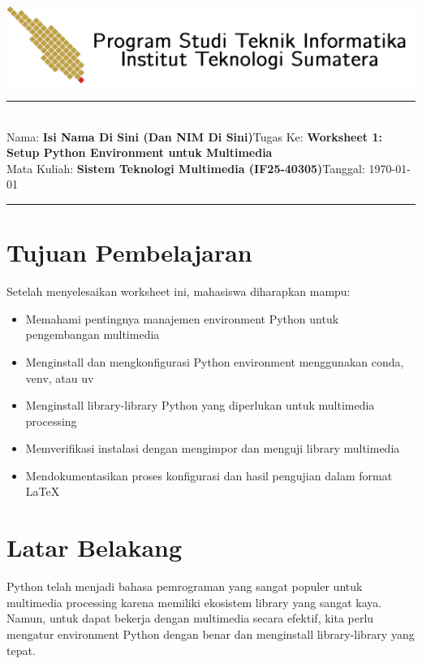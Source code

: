 \documentclass[11pt,a4paper]{article}
\newcommand{\student}{\textbf{Isi Nama Di Sini (Dan NIM Di Sini)}}
\newcommand{\course}{\textbf{Sistem Teknologi Multimedia (IF25-40305)}}
\newcommand{\assignment}{\textbf{Worksheet 1: Setup Python Environment untuk Multimedia}}
\begin{document}
\thispagestyle{empty}
\begin{center}
	\includegraphics[scale = 0.15]{Figure/ifitera-header.png}
	\vspace{0.1cm}
\end{center}
\noindent
\rule{17cm}{0.2cm}\\[0.3cm]
Nama: \student \hfill Tugas Ke: \assignment\\[0.1cm]
Mata Kuliah: \course \hfill Tanggal: \today\\
\rule{17cm}{0.05cm}
\vspace{0.1cm}



\section{Tujuan Pembelajaran}
Setelah menyelesaikan worksheet ini, mahasiswa diharapkan mampu:
\begin{itemize}
    \item Memahami pentingnya manajemen environment Python untuk pengembangan multimedia
    \item Menginstall dan mengkonfigurasi Python environment menggunakan conda, venv, atau uv
    \item Menginstall library-library Python yang diperlukan untuk multimedia processing
    \item Memverifikasi instalasi dengan mengimpor dan menguji library multimedia
    \item Mendokumentasikan proses konfigurasi dan hasil pengujian dalam format \LaTeX
\end{itemize}

\section{Latar Belakang}
Python telah menjadi bahasa pemrograman yang sangat populer untuk multimedia processing karena memiliki ekosistem library yang sangat kaya. Namun, untuk dapat bekerja dengan multimedia secara efektif, kita perlu mengatur environment Python dengan benar dan menginstall library-library yang tepat.
\end{document}

